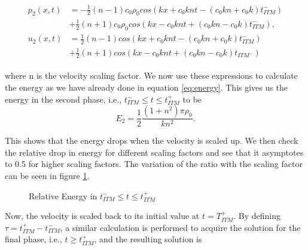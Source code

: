 \begin{align}
    \begin{split}
        p_{2}\left(x, t\right) &= -\frac{1}{2} \left(n-1\right)c_0\rho_0cos\left(kx + c_0knt - \left(c_0kn + c_0k\right)t_{ITM}^-\right) \\
        &+ \frac{1}{2} \left(n+1\right)c_0\rho_0cos\left(kx - c_0knt + \left(c_0kn - c_0k\right)t_{ITM}^-\right), \\
        u_{2}\left(x, t\right) &= \frac{1}{2}\left(n-1\right)cos\left(kx + c_0knt - \left(c_0kn + c_0k\right)t_{ITM}^-\right)\\
        &+ \frac{1}{2}\left(n+1\right)cos\left(kx - c_0knt + \left(c_0kn-c_0k\right)t_{ITM^-}\right)
    \end{split}
\end{align}

where n is the velocity scaling factor. We now use these expressions to calculate the energy as we have already done in equation \ref{eq:energy}. This gives us the energy in the second phase, i.e., $t_{ITM}^- \leq t \leq t_{ITM}^+ $ to be
\begin{equation}
    E_2 = \frac{1}{2}\frac{\left(1 + n^2\right)\pi \rho_0}{kn^2} .
\end{equation}

This shows that the energy drops when the velocity is scaled up. We then check the relative drop in energy for different scaling factors and see that it asymptotes to 0.5 for higher scaling factors. The variation of the ratio with the scaling factor can be seen in figure \ref{fig:ratio1}.

\begin{figure}
    \centering
    \caption{Relative Energy in $t_{ITM}^- \leq t \leq t_{ITM}^+$}
    \label{fig:ratio1}
\end{figure}

Now, the velocity is scaled back to its initial value at $t=T_{ITM}^+$. By defining $\tau = t_{ITM}^+ - t_{ITM}^-$, a similar calculation is performed to acquire the
solution for the final phase, i.e., $t \geq t_{ITM}^+$, and the resulting solution is

